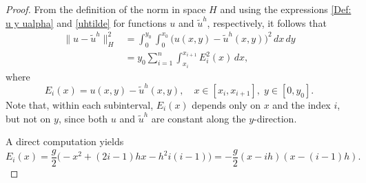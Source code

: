 \documentclass[11pt]{article}
\newcommand{\dee}{d}
\begin{document}
\begin{proof} 
From the definition of the norm in space $H$ and using the expressions \eqref{Def: u y ualpha} and \eqref{uhtilde} for functions $u$ and ${\widetilde{u}^h}$, respectively, it follows that
\begin{equation}\label{cuenta-intermedia}
\begin{aligned}
\|u-{\widetilde{u}^h}\|_{H}^2
&= \int_0^{y_0} \int_0^{x_0} \big(u(x,y)-{\widetilde{u}^h}(x,y)\big)^2 \, \dee x \, \dee y \\[1ex]
&= y_0 \sum_{i=1}^n \int_{x_i}^{x_{i+1}} E_i^2(x)\, \dee x,
\end{aligned}
\end{equation}
where 
\[
E_i(x) = u(x,y) - {\widetilde{u}^h}(x,y), \quad x \in [x_i, x_{i+1}], \; y \in [0, y_0].
\] 
Note that, within each subinterval, $E_i(x)$ depends only on $x$ and the index $i$, but not on $y$, since both $u$ and ${\widetilde{u}^h}$ are constant along the $y$-direction.  

A direct computation yields
\begin{equation}\label{Ei}
E_i(x) = \frac{g}{2} \Big(-x^2 + (2i-1) h x - h^2 i(i-1) \Big) 
= -\frac{g}{2} (x - i h)(x - (i-1) h).
\end{equation}


\end{proof}
\end{document}
